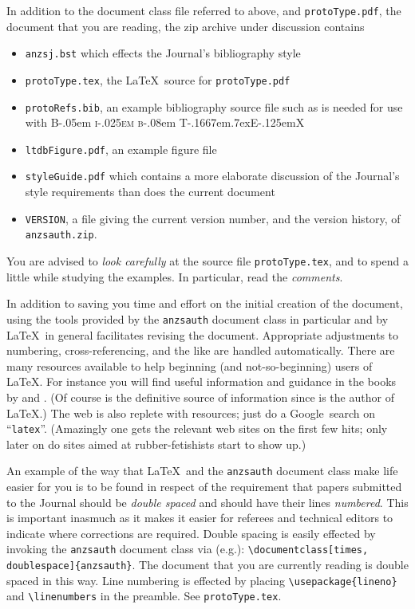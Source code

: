 \documentclass[times, doublespace]{anzsauth}
\newcommand\BibTeX{{\rmfamily B\kern-.05em \textsc{i\kern-.025em b}\kern-.08em
T\kern-.1667em\lower.7ex\hbox{E}\kern-.125emX}}
\begin{document}
In addition to the document class file referred to above, and
\texttt{protoType.pdf}, the document that you are reading, the zip
archive under discussion contains
\begin{itemize}
\item \texttt{anzsj.bst} which effects the Journal's bibliography
style
\item \texttt{protoType.tex}, the \LaTeX\ source for \texttt{protoType.pdf}
\item \texttt{protoRefs.bib}, an example bibliography source file such
as is needed for use with \BibTeX
\item \texttt{ltdbFigure.pdf}, an example figure file
\item \texttt{styleGuide.pdf} which contains a more elaborate discussion
of the Journal's style requirements than does the current document
\item \texttt{VERSION}, a file giving the current version number,
and the version history, of \texttt{anzsauth.zip}.
\end{itemize}
You are advised to \emph{look carefully} at the source file
\texttt{protoType.tex}, and to spend a little while studying the
examples.  In particular, read the \emph{comments}.

In addition to saving you time and effort on the initial creation
of the document, using the tools provided by the \texttt{anzsauth}
document class in particular and by \LaTeX\ in general facilitates
revising the document.  Appropriate adjustments to numbering,
cross-referencing, and the like are handled automatically.  There are
many resources available to help beginning (and not-so-beginning)
users of \LaTeX.  For instance you will find useful information
and guidance in the books by \cite{KopkaDaly2003, Lamport1994} and
\cite{MittelbachGoossens2004}.  (Of course \citealt{Lamport1994} is
the definitive source of information since \citeauthor{Lamport1994}
is the author of \LaTeX.)  The web is also replete with resources;
just do a Google\texttrademark\ search on ``\texttt{latex}''.
(Amazingly one gets the relevant web sites on the first few hits;
only later on do sites aimed at rubber-fetishists start to show up.)

An example of the way that \LaTeX\ and the \texttt{anzsauth}
document class make life easier for you is to be found in respect
of the requirement that papers submitted to the Journal should be
\emph{double spaced} and should have their lines \emph{numbered}.
This is important inasmuch as it makes it easier for referees and
technical editors to indicate where corrections are required.  Double
spacing is easily effected by invoking the \texttt{anzsauth} document
class via (e.g.): \label{pg:dsln}
\verb!\documentclass[times, doublespace]{anzsauth}!.
The document that you are currently reading is double
spaced in this way.  Line numbering is effected by placing
\verb!\usepackage{lineno}! and \verb!\linenumbers! in the preamble.
See \texttt{protoType.tex}.
\end{document}
